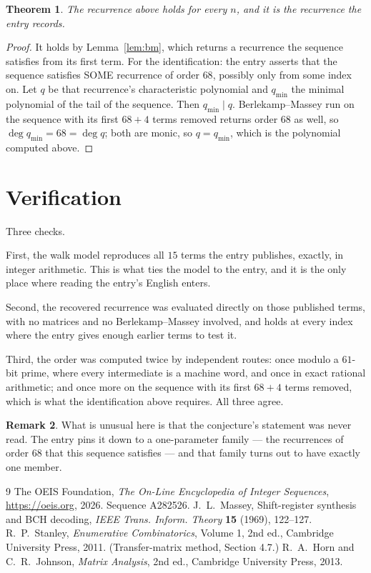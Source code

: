 \documentclass[11pt,a4paper]{article}
\theoremstyle{plain}
\newtheorem{theorem}{Theorem}
\theoremstyle{definition}
\newtheorem{remark}[theorem]{Remark}
\begin{document}
\begin{theorem}
The recurrence above holds for every $n$, and it is the recurrence the entry records.
\end{theorem}

\begin{proof}
It holds by Lemma~\ref{lem:bm}, which returns a recurrence the sequence satisfies from its
first term. For the identification: the entry asserts that the sequence satisfies SOME
recurrence of order $68$, possibly only from some index on. Let $q$ be that recurrence's
characteristic polynomial and $q_{\min}$ the minimal polynomial of the tail of the sequence.
Then $q_{\min}\mid q$. Berlekamp--Massey run on the sequence with its first $68+4$ terms
removed returns order $68$ as well, so $\deg q_{\min}=68=\deg q$; both are monic, so
$q=q_{\min}$, which is the polynomial computed above.
\end{proof}

\section{Verification}

Three checks.

First, the walk model reproduces all $15$ terms the entry publishes, exactly, in integer
arithmetic. This is what ties the model to the entry, and it is the only place where reading
the entry's English enters.

Second, the recovered recurrence was evaluated directly on those published terms, with no
matrices and no Berlekamp--Massey involved, and holds at every index where the entry gives
enough earlier terms to test it.

Third, the order was computed twice by independent routes: once modulo a $61$-bit prime, where
every intermediate is a machine word, and once in exact rational arithmetic; and once more on
the sequence with its first $68+4$ terms removed, which is what the identification above
requires. All three agree.

\begin{remark}
What is unusual here is that the conjecture's statement was never read. The entry pins it down
to a one-parameter family --- the recurrences of order $68$ that this sequence satisfies
--- and that family turns out to have exactly one member.
\end{remark}

\begin{thebibliography}{9}
 The OEIS Foundation, \emph{The On-Line Encyclopedia of Integer
Sequences}, \url{https://oeis.org}, 2026. Sequence A282526.
 J.~L.~Massey, Shift-register synthesis and BCH decoding, \emph{IEEE
Trans. Inform. Theory} \textbf{15} (1969), 122--127.
 R.~P.~Stanley, \emph{Enumerative Combinatorics}, Volume 1, 2nd ed.,
Cambridge University Press, 2011. (Transfer-matrix method, Section 4.7.)
 R.~A.~Horn and C.~R.~Johnson, \emph{Matrix Analysis}, 2nd ed., Cambridge
University Press, 2013.
\end{thebibliography}
\end{document}
